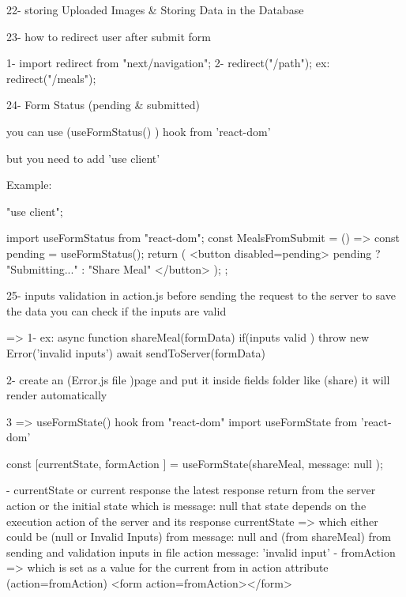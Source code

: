 22- storing Uploaded Images & Storing Data in the Database

23- how to redirect user after submit form 

        1-  import { redirect } from "next/navigation";
        2-  redirect("/path"); 
                ex: redirect("/meals");


24- Form Status (pending & submitted)

    you can use (useFormStatus() ) hook from 'react-dom'

    but you need to add 'use client'
    
    Example: 

        "use client";

        import { useFormStatus } from "react-dom";
        const MealsFromSubmit = () => {
            const { pending } = useFormStatus();
            return (
                <button disabled={pending}>
                    {pending ? "Submitting..." : "Share Meal"}
                </button>
            );
        };

25- inputs validation 
    in action.js before sending the request to the server to save the data 
    you can check if the inputs are valid 

    =>
            1-  ex: 
            async function shareMeal(formData){
                if(inputs valid ){
                        throw new Error('invalid inputs')
                }
                await sendToServer(formData)
            }

            2- create an (Error.js file )page and put it inside fields folder like (share)
                it will render automatically

    3 => 
        useFormState() hook from "react-dom"
        import {useFormState} from 'react-dom'

          const [currentState, formAction ] = useFormState(shareMeal, { message: null });

          - currentState or current response the latest response return from the server action or the initial state which is {message: null}
                that state depends on the execution action of the server and its response
                currentState => which either could be (null or Invalid Inputs) from {message: null} and (from shareMeal) from sending and validation inputs in file action {message: 'invalid input'}
          - fromAction => which is set as a value for the current from in action attribute (action={fromAction})
            <form action={fromAction}></form>

